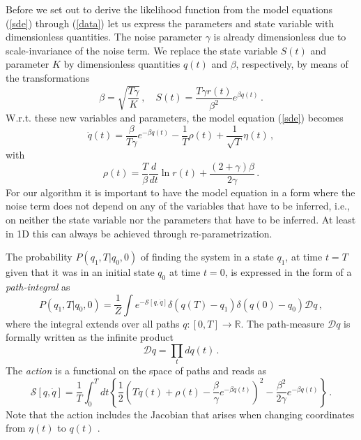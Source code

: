 \documentclass[12pt,a4paper,final]{iopart}
\newcommand{\dt}{\mathit{dt}}
\begin{document}
Before we set out to derive the likelihood function from the model equations (\ref{sde}) through (\ref{data}) let us express the parameters and state variable with dimensionless quantities.
The noise parameter $\gamma$ is already dimensionless due to scale-invariance of the noise term.
We replace the state variable $S(t)$ and parameter $K$ by dimensionless quantities $q(t)$ and $\beta$, respectively, by means of the transformations
\begin{equation}
  \beta=\sqrt{\frac{T\gamma}{K}}\,,\quad
  S(t)=\frac{T\gamma r(t)}{\beta^2}e^{\beta q(t)}\,.
\end{equation}
W.r.t. these new  variables and parameters, the model equation (\ref{sde}) becomes
\begin{equation}
  \dot q(t)
  =
  \frac{\beta}{T\gamma}e^{-\beta q(t)}
  -
  \frac{1}{T}\rho(t)
  +
  \frac{1}{\sqrt{T}}\eta(t)\,,
\end{equation}
with
\begin{equation}
  \rho(t)
  =
  \frac{T}{\beta}\frac{d}{dt}\ln r(t)
  +
  \frac{(2+\gamma)\beta}{2\gamma}\,.
\end{equation}
For our algorithm it is important to have the model equation in a form where the noise term does not depend on any of the variables that have to be inferred, i.e., on neither the state variable nor the parameters that have to be inferred.
At least in 1D this can always be achieved through re-parametrization.

The probability $P(q_1,T|q_0,0)$ of finding the system in a state $q_1$, at time $t = T$ given that it was in an initial state $q_0$ at time $t = 0$, is expressed in the form of a {\em path-integral} as
\begin{equation}\label{pathint}
P(q_1,T|q_0,0)
=
\frac{1}{Z}
\int
e^{-{\mathcal S}[q,\dot q]}
\delta(q(T)-q_1)
\delta(q(0)-q_0)
\mathcal{D}q \,,
\end{equation}
where the integral extends over all paths $q:[0,T]\rightarrow \mathbb R$.
The path-measure $\mathcal Dq$ is formally written as the infinite product
\begin{equation}\label{pathmeasure_q}
{\mathcal Dq}
=
\prod_{t}
dq(t)\,.
\end{equation}
The {\em action} is a functional on the space of paths and reads as
\begin{equation}\label{action1}
{\mathcal S}[{q},\dot q]
=
\frac{1}{T}
\int_0^T \dt \left\{
\frac{1}{2}
\left(
    T\dot q(t)
    +
    \rho(t)
    -
    \frac{\beta}{\gamma}e^{-\beta q(t)}\right)^2
    -
    \frac{\beta^2}{2\gamma}e^{-\beta q(t)}
\right\} \,.
\end{equation}
Note that the action includes the Jacobian that arises when changing coordinates from ${\eta(t)}$ to $q(t)$ \cite{lau_2007_StateDepDiff}.
\end{document}
